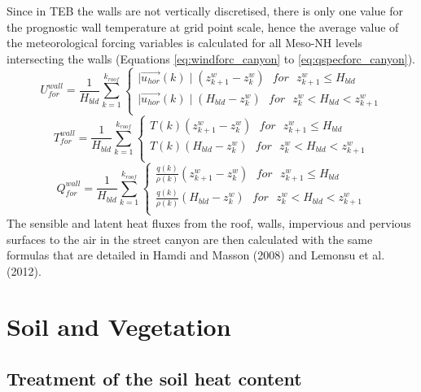 %
Since in TEB the walls are not vertically discretised, there is only one value for the
prognostic wall temperature at grid point scale, hence the average value of the
meteorological forcing variables is calculated for all Meso-NH levels intersecting
the walls (Equations \ref{eq:windforc_canyon} to \ref{eq:qspecforc_canyon}).
%
\begin{equation}
\label{eq:windforc_canyon}
U^{wall}_{for} = \frac{1}{H_{bld}} \sum_{k=1}^{k_{roof}} 
\begin{cases}
\mid \vec{u_{hor}}(k) \mid (z^{w}_{k+1}-z^{w}_{k}) \ \ \ for \ \ \  z^{w}_{k+1} \leq H_{bld} \\
\mid \vec{u_{hor}}(k) \mid (H_{bld}-z^{w}_{k}) \ \ \  for \ \ \  z^{w}_{k} < H_{bld} < z^{w}_{k+1} \\
\end{cases}
\end{equation}
%
\begin{equation}
\label{eq:tempforc_canyon}
T^{wall}_{for} = \frac{1}{H_{bld}} \sum_{k=1}^{k_{roof}} 
\begin{cases}
T(k) (z^{w}_{k+1}-z^{w}_{k}) \ \ \ for \ \ \ z^{w}_{k+1} \leq H_{bld} \\
T(k) (H_{bld}-z^{w}_{k}) \ \ \ for \ \ \ z^{w}_{k} < H_{bld} < z^{w}_{k+1} \\
\end{cases}
\end{equation}
%
\begin{equation}
\label{eq:qspecforc_canyon}
Q^{wall}_{for} = \frac{1}{H_{bld}} \sum_{k=1}^{k_{roof}}
\begin{cases}
\frac{q(k)}{\rho(k)} (z^{w}_{k+1}-z^{w}_{k}) \ \ \ for \ \ \  z^{w}_{k+1} \leq H_{bld} \\
\frac{q(k)}{\rho(k)} (H_{bld}-z^{w}_{k}) \ \ \  for \ \ \  z^{w}_{k} < H_{bld} < z^{w}_{k+1} \\
\end{cases}
\end{equation}
%
The sensible and latent heat fluxes from the roof, walls, impervious and pervious surfaces
to the air in the street canyon are then calculated with the same formulas that are
detailed in Hamdi and Masson (2008) and Lemonsu et al. (2012).
%
\clearpage
\section{Soil and Vegetation}

\subsection{Treatment of the soil heat content}

